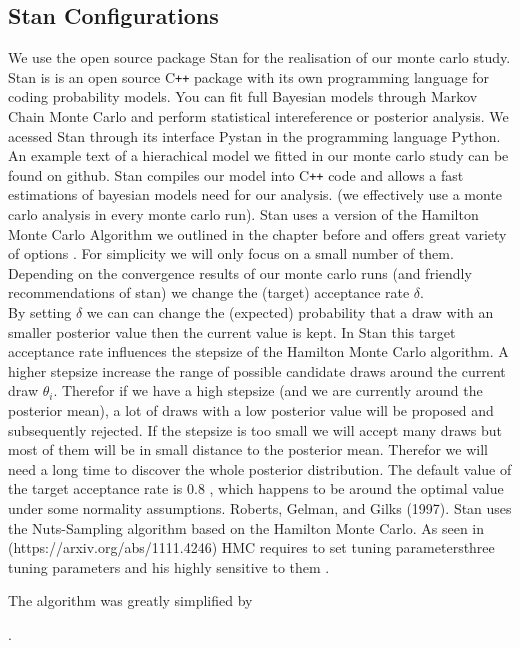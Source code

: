 \subsection{Stan Configurations}
We use the open source package Stan for the realisation of our monte carlo study.
Stan is is an open source C\texttt{++} package with its own programming language for coding probability models. You can fit full Bayesian models through Markov Chain Monte Carlo and perform statistical intereference or posterior analysis. We acessed Stan through its interface Pystan in the programming language Python. An example text of a hierachical model we fitted in our monte carlo study can be found on github.
Stan compiles our model into C\texttt{++} code and allows a fast estimations of bayesian models need for our analysis. (we effectively use a monte carlo analysis in every monte carlo run). Stan uses a version of the Hamilton Monte Carlo Algorithm we outlined in the chapter before and offers great variety of options . For simplicity we will only focus on a small number of them. \\
Depending on the convergence results of our monte carlo runs (and friendly recommendations of stan) we change the (target) acceptance rate $\delta$.\\
By setting $\delta$ we can can change the (expected) probability that a draw with an smaller posterior value then the current value is kept. In Stan this target acceptance rate influences the stepsize of the Hamilton Monte Carlo algorithm. A higher stepsize increase the range of possible candidate draws around the current draw $\theta_i$. Therefor if we have a high stepsize (and we are currently around the posterior mean), a lot of draws with a low posterior value will be proposed and subsequently rejected. If the stepsize is too small we will accept many draws but most of them will be in small distance to the posterior mean. Therefor we will need a long time to discover the whole posterior distribution. The default value of the target acceptance rate is 0.8 , which happens to be around the optimal value under some normality assumptions. Roberts, Gelman, and Gilks (1997). \cite{roberts1997b}
Stan uses the Nuts-Sampling algorithm based on the Hamilton Monte Carlo. As seen in (https://arxiv.org/abs/1111.4246) HMC requires to set tuning parametersthree tuning parameters and his highly sensitive to them  \cite{neal2011}. 

The algorithm was greatly simplified by \cite{hoffman2014}

.%

